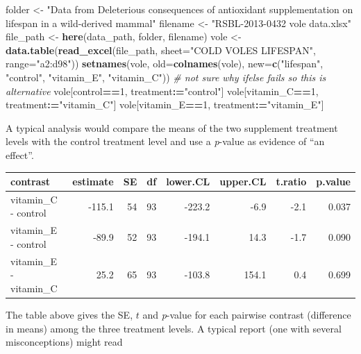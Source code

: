 \documentclass[]{book}
\newenvironment{Shaded}{\begin{snugshade}}{\end{snugshade}}
\newcommand{\KeywordTok}[1]{\textcolor[rgb]{0.13,0.29,0.53}{\textbf{#1}}}
\newcommand{\DataTypeTok}[1]{\textcolor[rgb]{0.13,0.29,0.53}{#1}}
\newcommand{\DecValTok}[1]{\textcolor[rgb]{0.00,0.00,0.81}{#1}}
\newcommand{\StringTok}[1]{\textcolor[rgb]{0.31,0.60,0.02}{#1}}
\newcommand{\CommentTok}[1]{\textcolor[rgb]{0.56,0.35,0.01}{\textit{#1}}}
\newcommand{\OperatorTok}[1]{\textcolor[rgb]{0.81,0.36,0.00}{\textbf{#1}}}
\newcommand{\ErrorTok}[1]{\textcolor[rgb]{0.64,0.00,0.00}{\textbf{#1}}}
\newcommand{\NormalTok}[1]{#1}
\begin{document}
\begin{Shaded}
\begin{Highlighting}[]
\NormalTok{folder <-}\StringTok{ "Data from Deleterious consequences of antioxidant supplementation on lifespan in a wild-derived mammal"}
\NormalTok{filename <-}\StringTok{ "RSBL-2013-0432 vole data.xlsx"}
\NormalTok{file_path <-}\StringTok{ }\KeywordTok{here}\NormalTok{(data_path, folder, filename)}
\NormalTok{vole <-}\StringTok{ }\KeywordTok{data.table}\NormalTok{(}\KeywordTok{read_excel}\NormalTok{(file_path, }\DataTypeTok{sheet=}\StringTok{"COLD VOLES LIFESPAN"}\NormalTok{, }\DataTypeTok{range=}\StringTok{"a2:d98"}\NormalTok{))}
\KeywordTok{setnames}\NormalTok{(vole, }\DataTypeTok{old=}\KeywordTok{colnames}\NormalTok{(vole), }\DataTypeTok{new=}\KeywordTok{c}\NormalTok{(}\StringTok{"lifespan"}\NormalTok{, }\StringTok{"control"}\NormalTok{, }\StringTok{"vitamin_E"}\NormalTok{, }\StringTok{"vitamin_C"}\NormalTok{))}
\CommentTok{# not sure why ifelse fails so this is alternative}
\NormalTok{vole[control}\OperatorTok{==}\DecValTok{1}\NormalTok{, treatment}\OperatorTok{:}\ErrorTok{=}\StringTok{"control"}\NormalTok{]}
\NormalTok{vole[vitamin_C}\OperatorTok{==}\DecValTok{1}\NormalTok{, treatment}\OperatorTok{:}\ErrorTok{=}\StringTok{"vitamin_C"}\NormalTok{]}
\NormalTok{vole[vitamin_E}\OperatorTok{==}\DecValTok{1}\NormalTok{, treatment}\OperatorTok{:}\ErrorTok{=}\StringTok{"vitamin_E"}\NormalTok{]}
\end{Highlighting}
\end{Shaded}

A typical analysis would compare the means of the two supplement
treatment levels with the control treatment level and use a
\emph{p}-value as evidence of ``an effect''.

\begin{tabular}{l|r|r|r|r|r|r|r}
\hline
contrast & estimate & SE & df & lower.CL & upper.CL & t.ratio & p.value\\
\hline
vitamin\_C - control & -115.1 & 54 & 93 & -223.2 & -6.9 & -2.1 & 0.037\\
\hline
vitamin\_E - control & -89.9 & 52 & 93 & -194.1 & 14.3 & -1.7 & 0.090\\
\hline
vitamin\_E - vitamin\_C & 25.2 & 65 & 93 & -103.8 & 154.1 & 0.4 & 0.699\\
\hline
\end{tabular}

The table above gives the SE, \(t\) and \emph{p}-value for each pairwise
contrast (difference in means) among the three treatment levels. A
typical report (one with several misconceptions) might read
\end{document}
